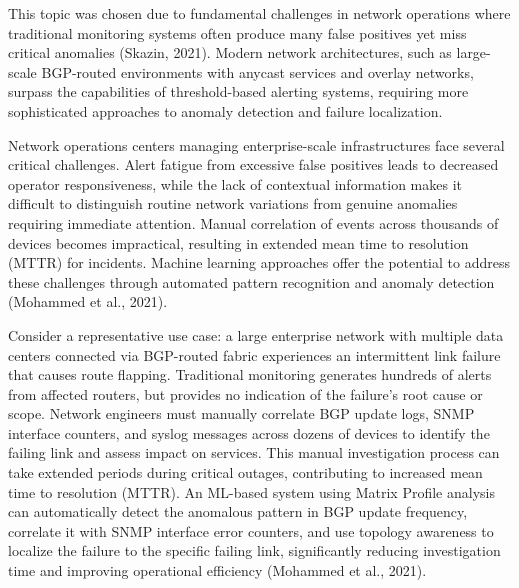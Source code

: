 \documentclass[11pt]{article}
\begin{document}
This topic was chosen due to fundamental challenges in network operations where traditional monitoring systems often produce many false positives yet miss critical anomalies (Skazin, 2021). Modern network architectures, such as large-scale BGP-routed environments with anycast services and overlay networks, surpass the capabilities of threshold-based alerting systems, requiring more sophisticated approaches to anomaly detection and failure localization.

Network operations centers managing enterprise-scale infrastructures face several critical challenges. Alert fatigue from excessive false positives leads to decreased operator responsiveness, while the lack of contextual information makes it difficult to distinguish routine network variations from genuine anomalies requiring immediate attention. Manual correlation of events across thousands of devices becomes impractical, resulting in extended mean time to resolution (MTTR) for incidents. Machine learning approaches offer the potential to address these challenges through automated pattern recognition and anomaly detection (Mohammed et al., 2021).

Consider a representative use case: a large enterprise network with multiple data centers connected via BGP-routed fabric experiences an intermittent link failure that causes route flapping. Traditional monitoring generates hundreds of alerts from affected routers, but provides no indication of the failure's root cause or scope. Network engineers must manually correlate BGP update logs, SNMP interface counters, and syslog messages across dozens of devices to identify the failing link and assess impact on services. This manual investigation process can take extended periods during critical outages, contributing to increased mean time to resolution (MTTR). An ML-based system using Matrix Profile analysis can automatically detect the anomalous pattern in BGP update frequency, correlate it with SNMP interface error counters, and use topology awareness to localize the failure to the specific failing link, significantly reducing investigation time and improving operational efficiency (Mohammed et al., 2021).
\end{document}
